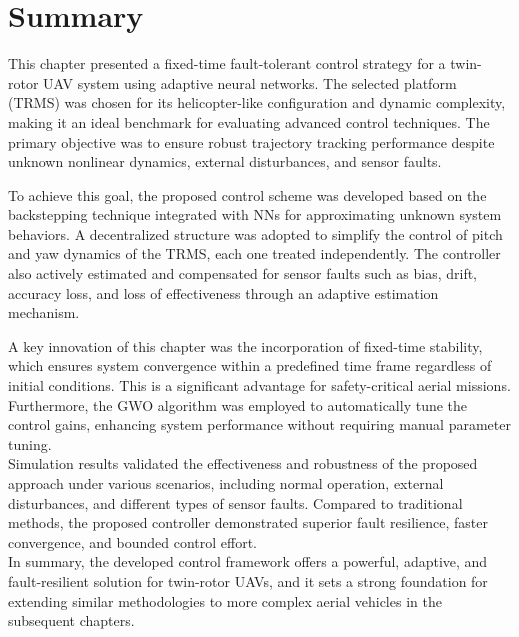 \section{Summary}
\label{sec:trms_conclusion}
This chapter presented a fixed-time fault-tolerant control strategy for a twin-rotor UAV system using adaptive neural networks. The selected platform (TRMS) was chosen for its helicopter-like configuration and dynamic complexity, making it an ideal benchmark for evaluating advanced control techniques. The primary objective was to ensure robust trajectory tracking performance despite unknown nonlinear dynamics, external disturbances, and sensor faults.

To achieve this goal, the proposed control scheme was developed based on the backstepping technique integrated with NNs for approximating unknown system behaviors. A decentralized structure was adopted to simplify the control of pitch and yaw dynamics of the TRMS, each one treated independently. The controller also actively estimated and compensated for sensor faults such as bias, drift, accuracy loss, and loss of effectiveness through an adaptive estimation mechanism.

A key innovation of this chapter was the incorporation of fixed-time stability, which ensures system convergence within a predefined time frame regardless of initial conditions. This is a significant advantage for safety-critical aerial missions. Furthermore, the GWO algorithm was employed to automatically tune the control gains, enhancing system performance without requiring manual parameter tuning.\\
Simulation results validated the effectiveness and robustness of the proposed approach under various scenarios, including normal operation, external disturbances, and different types of sensor faults. Compared to traditional methods, the proposed controller demonstrated superior fault resilience, faster convergence, and bounded control effort.\\
In summary, the developed control framework offers a powerful, adaptive, and fault-resilient solution for twin-rotor UAVs, and it sets a strong foundation for extending similar methodologies to more complex aerial vehicles in the subsequent chapters.

